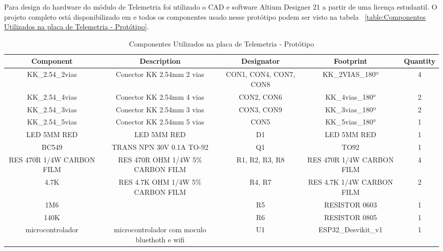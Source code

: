 \documentclass[../delivery_hospital_report.tex]{subfiles}
\begin{document}
Para design do hardware do módulo de Telemetria foi utilizado o CAD e software Altium Designer 21 \cite{altium21} a partir de uma licença estudantil. O projeto completo está disponibilizado em \cite{github_modulos} e todos os componentes usado nesse protótipo podem ser visto na tabela ~\ref{table:Componentes Utilizados na placa de Telemetria - Protótipo}.

\begin{table}[!h]
\caption{Componentes Utilizados na placa de Telemetria - Protótipo}
\centering
\begin{adjustbox}{width=\columnwidth,center}
\begin{tabular}{|c|c|c|c|c|}
\hline
Component                   & Description                                    & Designator               & Footprint                   & Quantity \\ \hline
KK\_2.54\_2vias             & Conector KK 2.54mm 2   vias                    & CON1, CON4, CON7,   CON8 & KK\_2VIAS\_180º             & 4        \\ \hline
KK\_2.54\_4vias             & Conector KK 2.54mm 4   vias                    & CON2, CON6               & KK\_4vias\_180°             & 2        \\ \hline
KK\_2.54\_3vias             & Conector KK 2.54mm 3   vias                    & CON3, CON9               & KK\_3vias\_180º             & 2        \\ \hline
KK\_2.54\_5vias             & Conector KK 2.54mm 5   vias                    & CON5                     & KK\_5vias\_180°             & 1        \\ \hline
LED 5MM RED                 & LED 5MM RED                                    & D1                       & LED 5MM RED                 & 1        \\ \hline
BC549                       & TRANS NPN 30V 0.1A   TO-92                     & Q1                       & TO92                        & 1        \\ \hline
RES 470R 1/4W   CARBON FILM & RES 470R OHM 1/4W 5\%   CARBON FILM            & R1, R2, R3, R8           & RES 470R 1/4W CARBON   FILM & 4        \\ \hline
4.7K                        & RES 4.7K OHM 1/4W 5\%   CARBON FILM            & R4, R7                   & RES 4.7K 1/4W CARBON   FILM & 2        \\ \hline
1M6                         &                                                & R5                       & RESISTOR 0603               & 1        \\ \hline
140K                        &                                                & R6                       & RESISTOR 0805               & 1        \\ \hline
microcontrolador            & microcontrolador com   moculo bluethoth e wifi & U1                       & ESP32\_Desvikit\_v1         & 1        \\ \hline


\end{tabular}
\end{adjustbox}
\end{table}
\end{document}
